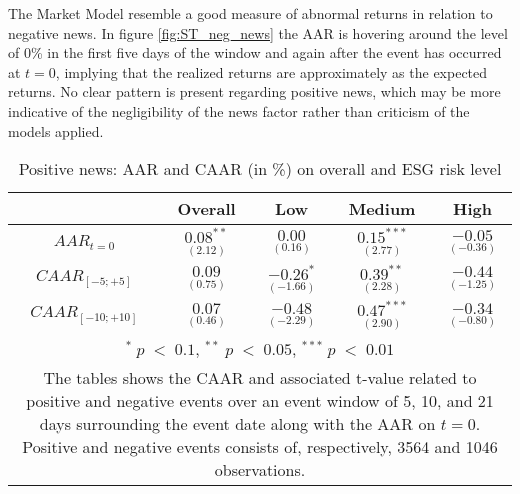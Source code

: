 The Market Model resemble a good measure of abnormal returns in relation to negative news. In figure \ref{fig:ST_neg_news} the AAR is hovering around the level of 0\% in the first five days of the window and again after the event has occurred at $t = 0$, implying that the realized returns are approximately as the expected returns. No clear pattern is present regarding positive news, which may be more indicative of the negligibility of the news factor rather than criticism of the models applied.   

\begin{table}[H]
\centering
\caption{Positive news: AAR and CAAR (in \%) on overall and ESG risk level} 
\begin{tabular}{ccccc}
  \hline  \hline
  & \multicolumn{1}{c}{Overall} &  \multicolumn{1}{c}{Low} & \multicolumn{1}{c}{Medium} & \multicolumn{1}{c}{High}\\  
 \hline
$AAR_{t=0}$ &  $\underset{(2.12)}{0.08^{**}}$ & $\underset{(0.16)}{0.00}$ & $\underset{(2.77)}{0.15^{***}}$ &  $\underset{(-0.36)}{-0.05}$ \\ 
$CAAR_{[-5;+5]}$  & $\underset{(0.75)}{0.09}$ &  $\underset{(-1.66)}{-0.26^{*}}$ &  $\underset{(2.28)}{0.39^{**}}$ &  $\underset{(-1.25)}{-0.44}$ \\ 
$CAAR_{[-10;+10]}$    & $\underset{(0.46)}{0.07}$ &  $\underset{(-2.29)}{-0.48}$ &  $\underset{(2.90)}{0.47^{***}}$ &  $\underset{(-0.80)}{-0.34}$ \\ 
    \hline \hline
   \multicolumn{5}{p{10cm}}{ \footnotesize $^* \; p\; <\; 0.1$, $ ^{**} \; p\; <\; 0.05$, $ ^{***} \; p\; <\; 0.01$  } \\
   \multicolumn{5}{p{10cm}}{\footnotesize The tables shows the CAAR and associated t-value related to positive and negative events over an event window of 5, 10, and 21 days surrounding the event date along with the AAR on $t=0$. Positive and negative events consists of, respectively, 3564 and 1046 observations. } \\
   \hline
\end{tabular}
\label{tab: ST_pos_significance}
\end{table}

